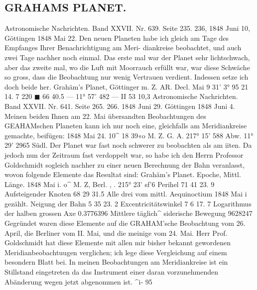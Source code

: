 \documentclass[10pt,a4paper]{article}
\begin{document}
\subsection*{GRAHAMS  PLANET.}

Astronomische  Nachrichten.    Band  XXVII.  Nr.  639.  Seite  235.  236,     1848  Juni  10,
Göttingen  1848  Mai  22.
Den  neuen  Planeten  habe  ich  gleich  am  Tage    des  Empfanges  Ihrer  Benachrichtigung   am  Meri-
diankreise beobachtet,    und  auch  zwei  Tage  nachher  noch  einmal.      Das  erste  mal  war  der  Planet  sehr
lichtschwach,    aber    das   zweite  mal,   wo  die  Luft  mit  Moorrauch  erfüllt  war,   war   diese  Schwäche  so
gross,  dass  die  Beobachtung  nur  wenig  Vertrauen  verdient.     Indessen  setze  ich  doch  beide  her.
Grahäm's  Planet,
Göttinger  m.  Z.  AR.  Decl.
Mai    9
31'\glqq{}    3°  95
21     14.   7
220\glqq{}
\ensuremath{\blacksquare}
6\glqq{}6
40.5
---  11°  57'    48\glqq{}2
---  II     53     10,3
Astronomische  Nachrichten.     Band  XXVII.  Nr.  641.  Seite  265.  266.     1848  Juni  29.
Göttingen  1848  Juni  4.
Meinen  beiden  Ihnen  am  22.  Mai  übersandten  Beobachtungen  des  GEAHAMschen  Planeten  kann  ich
nur  noch  eine,  gleichfalls  am  Meridiankreise  gemachte,  beifügen:
1848  Mai  24.     10\textasciicircum{}  18\glqq{}  39«o  M.  Z.         G.  A.  217°  15'  58\glqq{}8         Abw.  11°  29'  29\glqq{}65  Südl.
Der  Planet  war  fast  noch  schwerer  zu  beobachten  als  am  iiten.  Da  jedoch  nun  der  Zeitraum
fast  verdoppelt  war,  so  habe  ich  den  Herrn  Professor  Goldschmidt  sogleich  nachher  zu  einer  neuen
Berechnung  der  Bahn  veranlasst,  wovon  folgende  Elemente  das  Resultat  sind:
Grahäm's  Planet.
Epoche,  Mittl.  Länge.  1848  Mai  i.   o\textasciicircum{}  M.  Z,  Berl.     ,     .  215°  23'   sf'6
Perihel    71     41     23. 9
Aufsteigender  Knoten    68     29     31.5
Alle  drei  vom  mittl.  Aequinoctium  1848  Mai  i  gezählt.
Neigung  der  Bahn    5     35     23. 2
Excentricitätswinkel    7       6     17. 7
Logarithmus  der  halben  grossen  Axe    0.3776396
Mittlere  täglich\textasciicircum{}  siderische  Bewegung    962\glqq{}8247
Gegründet  waren  diese  Elemente  auf  die  GRAHAM'sche  Beobachtung  vom  26.  April,   die   Berliner
vom  II.  Mai,   und   die   meinige    vom   24.  Mai.      Herr  Prof.  Goldschmidt   hat  diese  Elemente  mit  allen
mir  bisher  bekannt   gewordenen   Meridianbeobachtuugen   verglichen;   ich   lege   diese  Vergleichung  auf
einem  besondern  Blatt  bei.    In  meinen  Beobachtungen  am  Meridiankreise  ist  ein  Stillstand  eingetreten
da  das  Instrument  einer  daran  vorzunehmenden  Abänderung  wegen  jetzt  abgenommen  ist.
\textasciicircum{}i-  95
\end{document}
